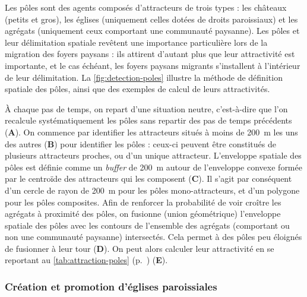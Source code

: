 Les pôles sont des agents composés d'attracteurs de trois types : les châteaux (petits et gros), les églises (uniquement celles dotées de droits paroissiaux) et les agrégats (uniquement ceux comportant une communauté paysanne).
Les pôles et leur délimitation spatiale revêtent une importance particulière lors de la migration des foyers paysans : ils attirent d'autant plus que leur attractivité est importante, et le cas échéant, les foyers paysans migrants s'installent à l'intérieur de leur délimitation.
La \cref{fig:detection-poles} illustre la méthode de définition spatiale des pôles, ainsi que des exemples de calcul de leurs attractivités.

À chaque pas de temps, on repart d'une situation \og neutre\fg{}, c'est-à-dire que l'on recalcule systématiquement les pôles sans repartir des pas de temps précédents (\textbf{A}).
On commence par identifier les attracteurs situés à moins de 200~m les uns des autres (\textbf{B}) pour identifier les pôles : ceux-ci peuvent être constitués de plusieurs attracteurs proches, ou d'un unique attracteur.
L'enveloppe spatiale des pôles est définie comme un \textit{buffer} de 200~m autour de l'enveloppe convexe formée par le centroïde des attracteurs qui les composent (\textbf{C}).
Il s'agit par conséquent d'un cercle de rayon de 200~m pour les pôles mono-attracteurs, et d'un polygone pour les pôles composites.
Afin de renforcer la probabilité de voir croître les agrégats à proximité des pôles, on fusionne (union géométrique) l'enveloppe spatiale des pôles avec les contours de l'ensemble des agrégats (comportant ou non une communauté paysanne) intersectés.
Cela permet à des pôles peu éloignés de fusionner à leur tour (\textbf{D}).
On peut alors calculer leur attractivité en se reportant au \cref{tab:attraction-poles} (p.~\pageref{tab:attraction-poles}) (\textbf{E}).


	
	\subsubsection{Création et promotion d'églises paroissiales \label{sssec:paroisses}}
	
